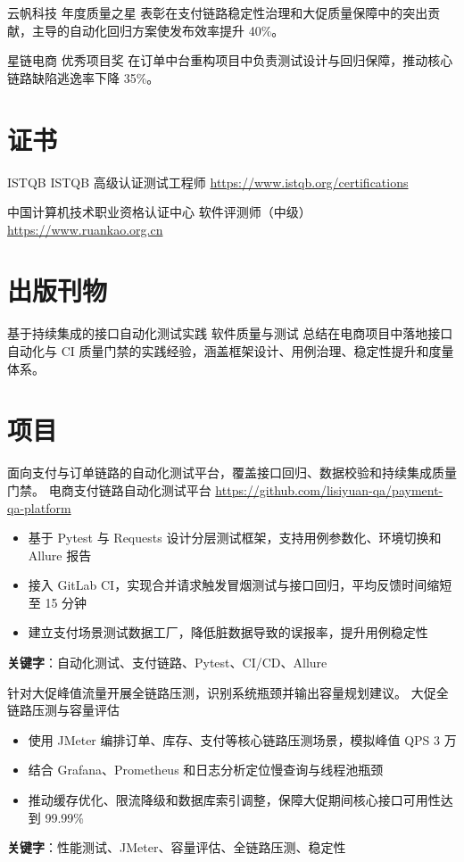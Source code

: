 \documentclass[a4paper, serif, 10pt]{moderncv}
\begin{document}
        {云帆科技}
        {年度质量之星}
        {}
        {}
        {表彰在支付链路稳定性治理和大促质量保障中的突出贡献，主导的自动化回归方案使发布效率提升 40\%。}

        {星链电商}
        {优秀项目奖}
        {}
        {}
        {在订单中台重构项目中负责测试设计与回归保障，推动核心链路缺陷逃逸率下降 35\%。}
\section{证书}

        {ISTQB}
        {ISTQB 高级认证测试工程师}
        {\url{https://www.istqb.org/certifications}}
        {}
        {}

        {中国计算机技术职业资格认证中心}
        {软件评测师（中级）}
        {\url{https://www.ruankao.org.cn}}
        {}
        {}
\section{出版刊物}

        {基于持续集成的接口自动化测试实践}
        {软件质量与测试}
        {}
        {}
        {总结在电商项目中落地接口自动化与 CI 质量门禁的实践经验，涵盖框架设计、用例治理、稳定性提升和度量体系。}
\section{项目}

        {面向支付与订单链路的自动化测试平台，覆盖接口回归、数据校验和持续集成质量门禁。}
        {电商支付链路自动化测试平台}
        {\url{https://github.com/lisiyuan-qa/payment-qa-platform}}
        {}
        {\begin{itemize}
\item 基于 Pytest 与 Requests 设计分层测试框架，支持用例参数化、环境切换和 Allure 报告
\item 接入 GitLab CI，实现合并请求触发冒烟测试与接口回归，平均反馈时间缩短至 15 分钟
\item 建立支付场景测试数据工厂，降低脏数据导致的误报率，提升用例稳定性
\end{itemize}
\textbf{关键字}：自动化测试、支付链路、Pytest、CI/CD、Allure}

        {针对大促峰值流量开展全链路压测，识别系统瓶颈并输出容量规划建议。}
        {大促全链路压测与容量评估}
        {}
        {}
        {\begin{itemize}
\item 使用 JMeter 编排订单、库存、支付等核心链路压测场景，模拟峰值 QPS 3 万
\item 结合 Grafana、Prometheus 和日志分析定位慢查询与线程池瓶颈
\item 推动缓存优化、限流降级和数据库索引调整，保障大促期间核心接口可用性达到 99.99\%
\end{itemize}
\textbf{关键字}：性能测试、JMeter、容量评估、全链路压测、稳定性}
\end{document}
